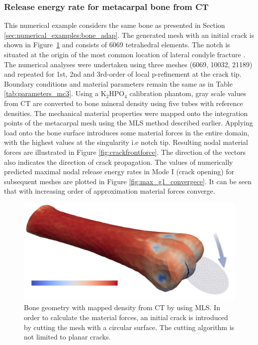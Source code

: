 \documentclass[11pt]{ACMEarticle}
\numberwithin{equation}{section}
\begin{document}
\subsubsection{Release energy rate for metacarpal bone from CT}
This numerical example considers the same bone as presented in Section \ref{sec:numerical_examples:bone_adap}. The generated mesh with an initial crack is shown in Figure~\ref{fig:bone_ct_mesh_cut} and consists of 6069 tetrahedral elements. The notch is situated at the origin of the most common location of lateral condyle fracture \citep{jacklin2012frequency}. The numerical analyses were undertaken using three meshes (6069, 10032, 21189) and repeated for 1st, 2nd and 3rd-order of local p-refinement at the crack tip. Boundary conditions and material parameters remain the same as in Table \ref{tab:parameters_mc3}. Using a $ \mathrm {K_2 HPO_4  }$ calibration phantom, gray scale values from CT are converted to bone mineral density using five tubes with reference densities. The mechanical material properties were mapped onto the integration points of the metacarpal mesh using the MLS method described earlier. Applying load onto the bone surface introduces some material forces in the entire domain, with the highest values at the singularity i.e notch tip. Resulting nodal material forces are illustrated in Figure \ref{fig:crackfrontforce}. The direction of the vectors also indicates the direction of crack propagation.
The values of numerically predicted maximal nodal release energy rates in Mode I (crack opening) for subsequent meshes are plotted in Figure \ref{fig:max_g1_convergece}. It can be seen that with increasing order of approximation material forces converge.
\begin{figure}
	\centering
	\includegraphics[width=0.5\linewidth]{Figures/bone_ct_mesh_cut}
	\caption{Bone geometry with mapped density from CT by using MLS. In order to calculate the material forces, an initial crack is introduced by cutting the mesh with a circular surface. The cutting algorithm is not limited to planar cracks. }
	\label{fig:bone_ct_mesh_cut}
\end{figure}
\end{document}
